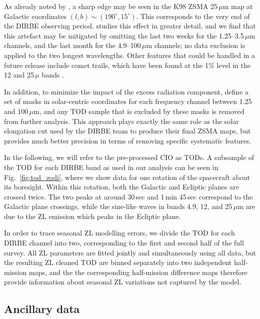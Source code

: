 \documentclass[twocolumn]{aa}
\begin{document}
As already noted by \citet{Kelsall1998}, a sharp edge may be seen in
the K98 ZSMA 25\,$\mu$m map at Galactic coordinates
$(l,b)\sim(190^{\circ},15^{\circ})$. This corresponds to the very end
of the DIRBE observing period. \citet{CG02_01} studies this effect in
greater detail, and we find that this artefact may be mitigated by
omitting the last two weeks for the 1.25--3.5\,$\mu$m channels, and
the last month for the 4.9--100$\,\mu$m channels; no data exclusion is
applied to the two longest wavelengths. Other  features that could be handled in a future release include comet trails, which have been found at the 1\% level in the 12 and 25\,$\mu$ bands \citep{arendt}.




In addition, to minimize the impact of the excess radiation component,
\citet{CG02_01} define a set of masks in solar-centric coordinates for
each frequency channel between 1.25 and 100\,$\mu$m, and any TOD
sample that is excluded by these masks is removed from further
analysis. This approach plays exactly the same role as the solar
elongation cut used by the DIRBE team to produce their final ZSMA
maps, but provides much better precision in terms of removing specific
systematic features.

In the following, we will refer to the pre-processed CIO as TODs.  A
subsample of the TOD for each DIRBE band as used in our analysis can
be seen in Fig.~\ref{fig:tod_zodi}, where we show data for one
rotation of the spacecraft about its boresight. Within this rotation,
both the Galactic and Ecliptic planes are crossed twice. The two peaks
at around 30\,sec and 1\,min 45\,sec correspond to the Galactic plane
crossings, while the sine-like waves in bands 4.9, 12, and 25\,$\mu$m
are due to the ZL emission which peaks in the Ecliptic plane.

In order to trace seasonal ZL modelling errors, we divide the TOD for
each DIRBE channel into two, corresponding to the first and second
half of the full survey. All ZL parameters are fitted jointly and
simultaneously using all data, but the resulting ZL cleaned TOD are
binned separately into two independent half-mission maps, and the the
corresponding half-mission difference maps therefore provide
information about seasonal ZL variations not captured by the model.

\subsection{Ancillary data}
\end{document}

